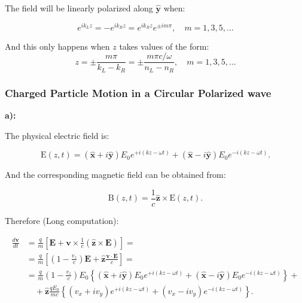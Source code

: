 The field will be linearly polarized along $\hat{\mathbf{y}}$ when:

\begin{equation}
	e^{i k_{L} z}=-e^{i k_{R} z}=e^{i k_{R} z} e^{\pm i m \pi}, \quad m=1,3,5, \ldots
\end{equation}

And this only happens when $z$ takes values of the form:
\begin{equation}
	z=\pm \frac{m \pi}{k_{L}-k_{R}}=\pm \frac{m \pi c / \omega}{n_{L}-n_{R}}, \quad m=1,3,5, \ldots
\end{equation}

\subsubsection{Charged Particle Motion in a Circular Polarized wave}\label{Charged Particle Motion in a Circular Polarized wave}


\textbf{a):}

The physical electric field is:

\begin{equation}
	\mathrm{E}(z, t)=(\hat{\mathbf{x}}+i \hat{\mathbf{y}}) E_{0} e^{+i(k z-\omega t)}+(\hat{\mathbf{x}}-i \hat{\mathbf{y}}) E_{0} e^{-i(k z-\omega t)}.
\end{equation}

And the corresponding magnetic field can be obtained from:

\begin{equation}
	\mathrm{B}(z, t)=\frac{1}{c} \hat{\mathbf{z}} \times \mathrm{E}(z, t).
\end{equation}

Therefore (Long computation):

\begin{equation}
	\begin{split}
		\frac{d \mathbf{v}}{d t} &=\frac{q}{m}\left[\mathbf{E}+\mathbf{v} \times \frac{1}{c}(\hat{\mathbf{z}} \times \mathbf{E})\right]= \\
		&=\frac{q}{m}\left[\left(1-\frac{v_{z}}{c}\right) \mathbf{E}+\hat{\mathbf{z}} \frac{\mathbf{v} \cdot \mathbf{E}}{c}\right] =\\
		&=\frac{q}{m}\left(1-\frac{v_{z}}{c}\right) E_{0}\left\{(\hat{\mathbf{x}}+i \hat{\mathbf{y}}) E_{0} e^{+i(k z-\omega t)}+(\hat{\mathbf{x}}-i \hat{\mathbf{y}}) E_{0} e^{-i(k z-\omega t)}\right\} +\\
		&\quad +\hat{\mathbf{z}} \frac{q E_{0}}{m c}\left\{\left(v_{x}+i v_{y}\right) e^{+i(k z-\omega t)}+\left(v_{x}-i v_{y}\right) e^{-i(k z-\omega t)}\right\}.
	\end{split}
\end{equation}

